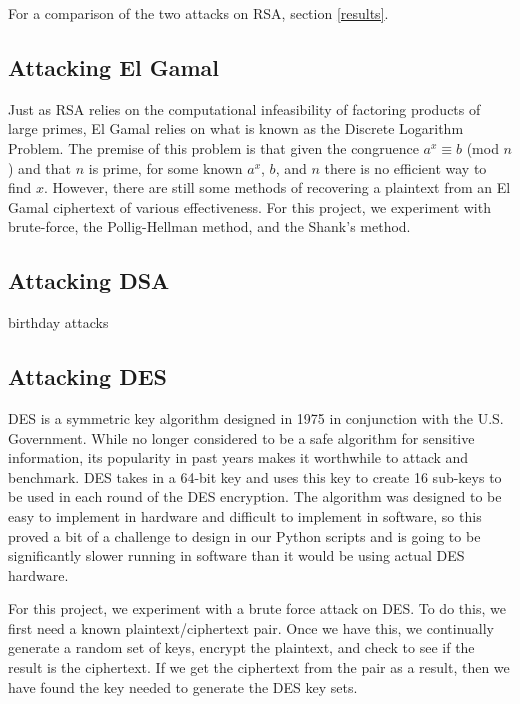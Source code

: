 \documentclass[12pt]{report}
\begin{document}
For a comparison of the two attacks on RSA, section \ref{results}.

\subsection{Attacking El Gamal}
Just as RSA relies on the computational infeasibility of factoring products of large primes, El Gamal relies on what is known as the Discrete Logarithm Problem. The premise of this problem is that given the congruence $a^{x} \equiv b$ (mod $n$) and that $n$ is prime, for some known $a^{x}$, $b$, and $n$ there is no efficient way to find $x$. However, there are still some methods of recovering a plaintext from an El Gamal ciphertext of various effectiveness. For this project, we experiment with brute-force, the Pollig-Hellman method, and the Shank's method. 


\subsection{Attacking DSA}
birthday attacks

\subsection{Attacking DES}
DES is a symmetric key algorithm designed in 1975 in conjunction with the U.S. Government. While no longer considered to be a safe algorithm for sensitive information, its popularity in past years makes it worthwhile to attack and benchmark. DES takes in a 64-bit key and uses this key to create 16 sub-keys to be used in each round of the DES encryption. The algorithm was designed to be easy to implement in hardware and difficult to implement in software, so this proved a bit of a challenge to design in our Python scripts and is going to be significantly slower running in software than it would be using actual DES hardware.

For this project, we experiment with a brute force attack on DES. To do this, we first need a known plaintext/ciphertext pair. Once we have this, we continually generate a random set of keys, encrypt the plaintext, and check to see if the result is the ciphertext. If we get the ciphertext from the pair as a result, then we have found the key needed to generate the DES key sets.
\end{document}
